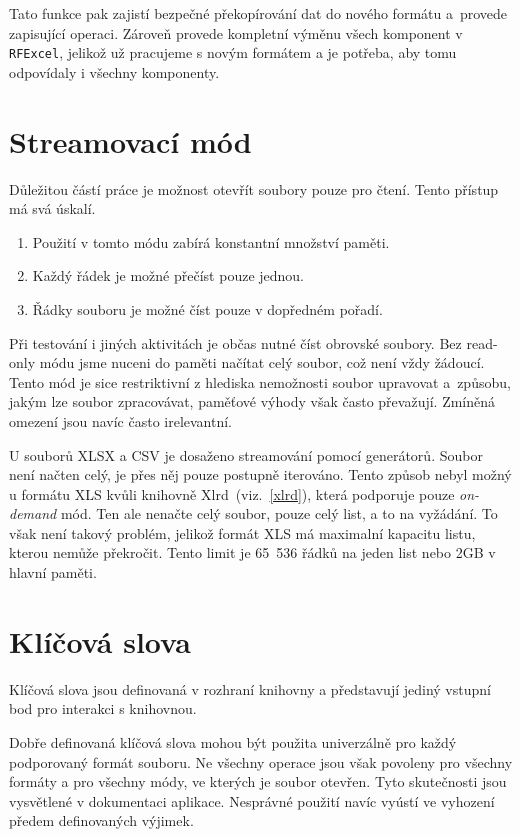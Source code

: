 Tato funkce pak zajistí bezpečné překopírování dat do nového formátu a~provede zapisující operaci. Zároveň provede kompletní výměnu všech komponent v \texttt{RFExcel}, jelikož už pracujeme s novým formátem a je potřeba, aby tomu odpovídaly i všechny komponenty.

\section{Streamovací mód}

Důležitou částí práce je možnost otevřít soubory pouze pro čtení. Tento přístup má svá úskalí.

\begin{enumerate}
    \item Použití v tomto módu zabírá konstantní množství paměti.
    \item Každý řádek je možné přečíst pouze jednou.
    \item Řádky souboru je možné číst pouze v dopředném pořadí.
\end{enumerate}

Při testování i jiných aktivitách je občas nutné číst obrovské soubory. Bez read-only módu jsme nuceni do paměti načítat celý soubor, což není vždy žádoucí. Tento mód je sice restriktivní z hlediska nemožnosti soubor upravovat a~způsobu, jakým lze soubor zpracovávat, paměťové výhody však často převažují. Zmíněná omezení jsou navíc často irelevantní. 

U souborů XLSX a CSV je dosaženo streamování pomocí generátorů. Soubor není načten celý, je přes něj pouze postupně iterováno. Tento způsob nebyl možný u formátu XLS kvůli knihovně Xlrd~(viz.~\ref{xlrd}), která podporuje pouze \textit{on-demand} mód. Ten ale nenačte celý soubor, pouze celý list, a to na vyžádání. To však není takový problém, jelikož formát XLS má maximalní kapacitu listu, kterou nemůže překročit. Tento limit je 65~536 řádků na jeden list nebo 2GB v hlavní paměti.~\cite{xlsLimit, XlsLimit2}

\section{Klíčová slova}

Klíčová slova jsou definovaná v rozhraní knihovny a představují jediný vstupní bod pro interakci s knihovnou. 

Dobře definovaná klíčová slova mohou být použita univerzálně pro každý podporovaný formát souboru. Ne všechny operace jsou však povoleny pro všechny formáty a pro všechny módy, ve kterých je soubor otevřen. Tyto skutečnosti jsou vysvětlené v dokumentaci aplikace. Nesprávné použití navíc vyústí ve vyhození předem definovaných výjimek.

